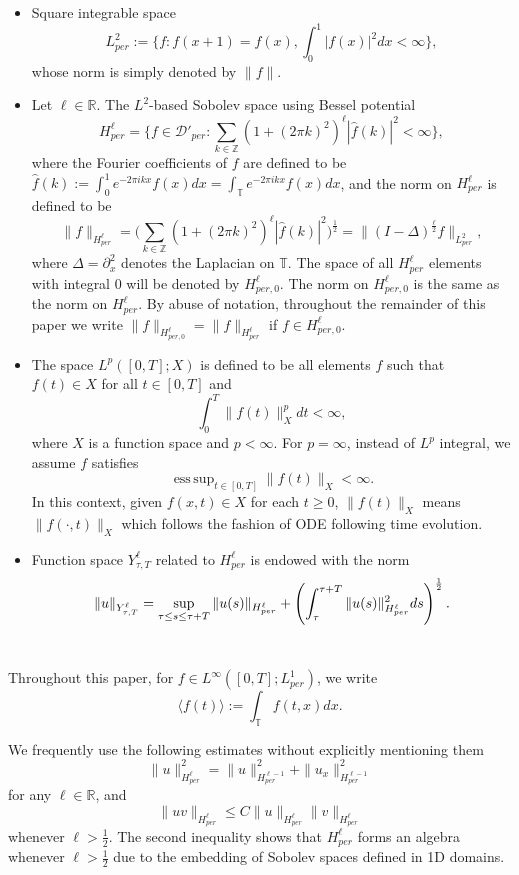 \documentclass[10pt,a4paper,final]{article}
\numberwithin{equation}{section}
\newcommand{\ds}{\displaystyle}
\newcommand{\Z}{\mathbb{Z}}
\newcommand{\R}{\mathbb{R}}
\newcommand{\bT}{\mathbb{T}}
\DeclareMathOperator*{\esssup}{ess\,sup}
\begin{document}
\begin{itemize}
    \item Square integrable space $$L^2_{per}:=\ds \bigg\{f: f(x+1)=f(x), \int_0^1|f(x)|^2dx<\infty\bigg\}, $$
    whose norm is simply denoted by $\|f\|.$
    \item Let $\ell\in \R$. The $L^2$-based Sobolev space using Bessel potential $$H^{\ell}_{per}=\bigg\{f\in \mathcal{D}'_{per}: \ds \sum_{k\in\Z} (1+(2\pi k)^2)^{\ell}|\widehat{f}(k)|^2<\infty\bigg\},$$ where the Fourier coefficients of $f$ are defined to be 
    $\ds \widehat{f}(k):=\int_0^1 e^{-2\pi i k x}f(x)dx=\int_{\bT} e^{-2\pi i kx}f(x)dx$, and the norm on $H^\ell_{per}$ is defined to be 
    $$\|f\|_{H^{\ell}_{per}}=\bigg( \sum_{k\in\Z} (1+(2\pi k)^2)^{\ell}|\widehat{f}(k)|^2\bigg)^{\frac{1}{2}}=\|(I-\Delta)^{\frac{\ell}{2}}f\|_{L^2_{per}},$$
    where $\Delta = \partial^2_{x}$ denotes the Laplacian on $\bT$. The space of all $H^{\ell}_{per}$ elements with integral 0 will be denoted by $H^{\ell}_{per, 0}$. The norm on $H^{\ell}_{per, 0}$ is the same as the norm on $H^{\ell}_{per}$. By abuse of notation, throughout the remainder of this paper we write $\|f\|_{H^{\ell}_{per, 0}}=\|f\|_{H^{\ell}_{per}}$ if $f\in H^{\ell}_{per, 0}$.
    \item The space $L^p([0,T];X)$ is defined to be all elements $f$ such that $f(t)\in X$ for all $t\in [0,T]$ and 
    $$\int_0^T\|f(t)\|_{X}^pdt<\infty,$$
    where $X$ is a function space and $p<\infty$. For $p=\infty$, instead of $L^p$ integral, we assume $f$ satisfies 
    $$\esssup_{t\in [0,T]} \|f(t)\|_X <\infty.$$
    In this context, given $f(x, t)\in X$ for each $t\ge 0$, $\|f(t)\|_X$ means $\|f(\cdot, t)\|_X$ which follows the fashion of ODE following time evolution.
    \item Function space $Y^\ell_{\tau, T}$ related to $H_{per}^\ell$ is endowed with the norm
 \begin{equation*}
\|u\|_{Y^\ell_{\tau, T}}=\sup_{\tau\le s\le \tau +T}\|u(s)\|_{H_{per}^\ell}+\left(\int_{\tau}^{\tau+T}\|u(s)\|^2_{H_{per}^\ell}ds\right)^{1\over 2}.
 \end{equation*} \\
\end{itemize}

Throughout this paper, for $f\in L^{\infty}([0,T]; L^1_{per})$, we write
$$\langle f(t)\rangle:=\int_{\bT} f(t,x)dx.$$

We frequently use the following estimates without explicitly mentioning them
$$\|u\|_{H^{\ell}_{per}}^2=\|u\|_{H^{\ell-1}_{per}}^2+\|u_x\|_{H^{\ell-1}_{per}}^2$$
for any $\ell\in \R$, 
and  
$$\|uv\|_{H^{\ell}_{per}}\leq C\|u\|_{H^{\ell}_{per}}\|v\|_{H^{\ell}_{per}}$$
whenever $\ell>\frac{1}{2}$. The second inequality shows that $H^{\ell}_{per}$ forms an algebra whenever $\ell>\frac{1}{2}$ due to the embedding of Sobolev spaces defined in 1D domains. 
\end{document}
